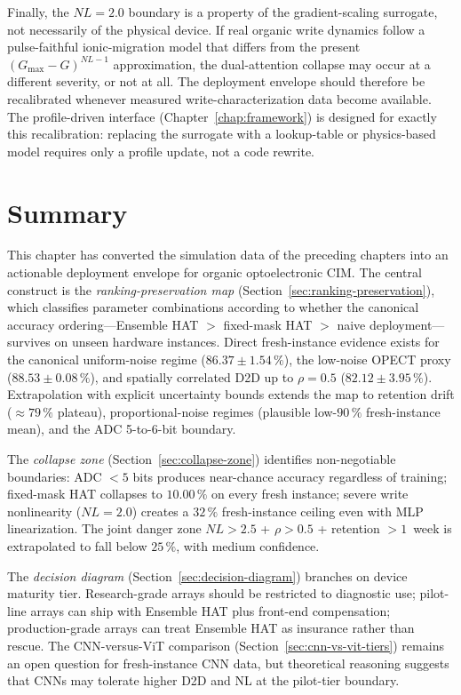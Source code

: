 Finally, the $NL=2.0$ boundary is a property of the gradient-scaling surrogate, not necessarily of the physical device.  If real organic write dynamics follow a pulse-faithful ionic-migration model that differs from the present $(G_{\max}-G)^{NL-1}$ approximation, the dual-attention collapse may occur at a different severity, or not at all.  The deployment envelope should therefore be recalibrated whenever measured write-characterization data become available.  The profile-driven interface (Chapter~\ref{chap:framework}) is designed for exactly this recalibration: replacing the surrogate with a lookup-table or physics-based model requires only a profile update, not a code rewrite.


\section{Summary}

This chapter has converted the simulation data of the preceding chapters into an actionable deployment envelope for organic optoelectronic CIM.  The central construct is the \emph{ranking-preservation map} (Section~\ref{sec:ranking-preservation}), which classifies parameter combinations according to whether the canonical accuracy ordering---Ensemble HAT $>$ fixed-mask HAT $>$ naive deployment---survives on unseen hardware instances.  Direct fresh-instance evidence exists for the canonical uniform-noise regime ($86.37\pm1.54\,\%$), the low-noise OPECT proxy ($88.53\pm0.08\,\%$), and spatially correlated D2D up to $\rho=0.5$ ($82.12\pm3.95\,\%$).  Extrapolation with explicit uncertainty bounds extends the map to retention drift ($\approx 79\,\%$ plateau), proportional-noise regimes (plausible low-$90\,\%$ fresh-instance mean), and the ADC 5-to-6-bit boundary.

The \emph{collapse zone} (Section~\ref{sec:collapse-zone}) identifies non-negotiable boundaries: ADC $< 5$ bits produces near-chance accuracy regardless of training; fixed-mask HAT collapses to $10.00\,\%$ on every fresh instance; severe write nonlinearity ($NL=2.0$) creates a $32\,\%$ fresh-instance ceiling even with MLP linearization.  The joint danger zone $NL > 2.5$ + $\rho > 0.5$ + retention $> 1$~week is extrapolated to fall below $25\,\%$, with medium confidence.

The \emph{decision diagram} (Section~\ref{sec:decision-diagram}) branches on device maturity tier.  Research-grade arrays should be restricted to diagnostic use; pilot-line arrays can ship with Ensemble HAT plus front-end compensation; production-grade arrays can treat Ensemble HAT as insurance rather than rescue.  The CNN-versus-ViT comparison (Section~\ref{sec:cnn-vs-vit-tiers}) remains an open question for fresh-instance CNN data, but theoretical reasoning suggests that CNNs may tolerate higher D2D and NL at the pilot-tier boundary.


